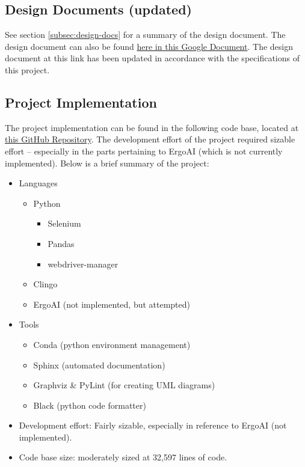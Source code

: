 \documentclass[12pt]{article}
\def \repoLink{https://github.com/AdebayoBraimah/CSE505}
\def \desDocLink{https://docs.google.com/document/d/1t48in8rdzC_VOijfAOP23C_YgAQxkow5eaE7AXEVUYM/edit?usp=sharing}
\begin{document}
    \subsection{Design Documents (updated)}
    \label{subsec:des-doc-up}

    See section \ref{subsec:design-docs} for a summary of the design document. The design document can also be found \href{\desDocLink}{here in this Google Document}. The design document at this link has been updated in accordance with the specifications of this project.

    \subsection{Project Implementation}
    \label{subsec:proj-imp}

    The project implementation can be found in the following code base, located at \href{\repoLink}{this GitHub Repository}. The development effort of the project required sizable effort -- especially in the parts pertaining to ErgoAI (which is not currently implemented). Below is a brief summary of the project:

    \begin{itemize}
        \item Languages
        \begin{itemize}
            \item Python
            \begin{itemize}
                \item Selenium
                \item Pandas
                \item webdriver-manager
            \end{itemize}
            \item Clingo
            \item ErgoAI (not implemented, but attempted)
        \end{itemize}
        \item Tools
            \begin{itemize}
                \item Conda (python environment management)
                \item Sphinx (automated documentation)
                \item Graphviz \& PyLint (for creating UML diagrams)
                \item Black (python code formatter)
            \end{itemize}
        \item Development effort: Fairly sizable, especially in reference to ErgoAI (not implemented).
        \item Code base size: moderately sized at 32,597 lines of code.
    \end{itemize}
\end{document}
